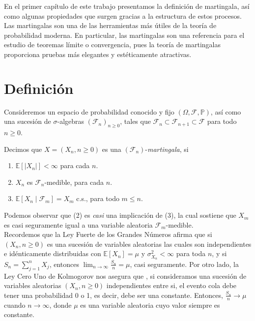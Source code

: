 En el primer capítulo de este trabajo presentamos la definición de martingala, así como algunas propiedades que surgen gracias a la estructura de estos procesos. Las martingalas son una de las herramientas más útiles de la teoría de probabilidad moderna. En particular, las martingalas son una referencia para el estudio de teoremas límite o convergencia, pues la teoría de martingalas proporciona pruebas más elegantes y estéticamente atractivas.

\section{Definición}
Consideremos un espacio de probabilidad conocido y fijo $(\Omega, \mathcal{F}, \mathbb{P})$, así como una sucesión de $\sigma$-algebras $(\mathcal{F}_n)_{n \geq 0}$, tales que $\mathcal{F}_n \subset \mathcal{F}_{n+1} \subset \mathcal{F}$ para todo $n \geq 0$.

\begin{definition}[Martingala]
\label{martingala}
	Decimos que $X = (X_n, n \geq 0)$ es una $(\mathcal{F}_n)$-\emph{martingala}, si
	\begin{enumerate}
		\item $\mathbb{E}[|X_n|] < \infty$ para cada $n$.
		\item $X_n$ es $\mathcal{F}_n$-medible, para cada $n$.
		\item $\mathbb{E}[X_n \mid \mathcal{F}_m] = X_m$ c.s., para todo $m \leq n$.
	\end{enumerate}
\end{definition}

Podemos observar que (2) es \emph{casi} una implicación de (3), la cual sostiene que $X_m$ es casi seguramente igual a una variable aleatoria $\mathcal{F}_m$-medible. \\

Recordemos que la Ley Fuerte de los Grandes Números afirma que \cite[p.~173]{jacodprotter} si $(X_n, n \geq 0)$ es una sucesión de variables aleatorias las cuales son independientes e idénticamente distribuidas con $\mathbb{E}[X_n] = \mu$ y $\sigma_{X_n}^{2} < \infty$ para toda $n$, y si $S_n = \sum_{j=1}^{n} X_j$, entonces $\lim_{n \rightarrow \infty} \frac{S_n}{n} = \mu$, casi seguramente. Por otro lado, la Ley Cero Uno de Kolmogorov nos asegura que \cite[p.~381]{shiryaev}, si consideramos una sucesión de variables aleatorias $(X_n, n \geq 0)$ independientes entre si, el evento cola debe tener una probabilidad 0 o 1, es decir, debe ser una constante. Entonces, $\frac{S_n}{n} \rightarrow \mu$ cuando $n \rightarrow \infty$, donde $\mu$ es una variable aleatoria cuyo valor siempre es constante. \\

